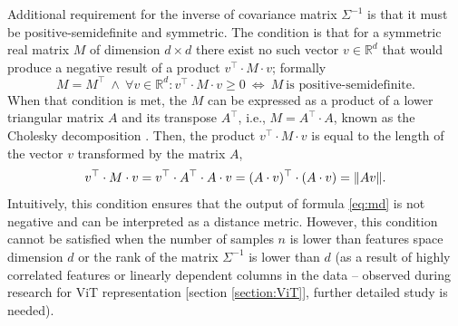 Additional requirement for the inverse of covariance matrix $\Sigma^{-1}$ is that it must be positive-semidefinite and symmetric. The condition is that for a symmetric real matrix $M$ of dimension $d \times d$ there exist no such vector $v \in \mathbb{R}^d$ that would produce a negative result of a product $v^\top \cdot M \cdot v$; formally
\begin{equation}
    M = M^\top
    ~
    \land
    ~
    \forall v \in \mathbb{R}^d: v^\top \cdot M \cdot v \geq 0
    ~
    \Longleftrightarrow
    ~
    M ~ \text{is positive-semidefinite}.
    \label{eq:M-positive-semidefinite}
\end{equation}
When that condition is met, the $M$ can be expressed as a product of a lower triangular matrix $A$ and its transpose $A^\top$, i.e., $M = A^\top \cdot A$, known as the Cholesky decomposition \cite{Higham-1990}. Then, the product $v^\top \cdot M \cdot v$ is equal to the length of the vector $v$ transformed by the matrix $A$,
\begin{equation}
    v^\top \cdot M \cdot v
    =
    v^\top \cdot A^\top \cdot A \cdot v
    =
    (A \cdot v)^\top \cdot (A \cdot v)
    =
    \norm{A v}
    .
    \label{eq:M-length}
\end{equation}
Intuitively, this condition ensures that the output of formula \ref{eq:md} is not negative and can be interpreted as a distance metric. However, this condition cannot be satisfied when the number of samples $n$ is lower than features space dimension $d$ or the rank of the matrix $\Sigma^{-1}$ is lower than $d$ (as a result of highly correlated features or linearly dependent columns in the data – observed during research for ViT representation [section \ref{section:ViT}], further detailed study is needed).

